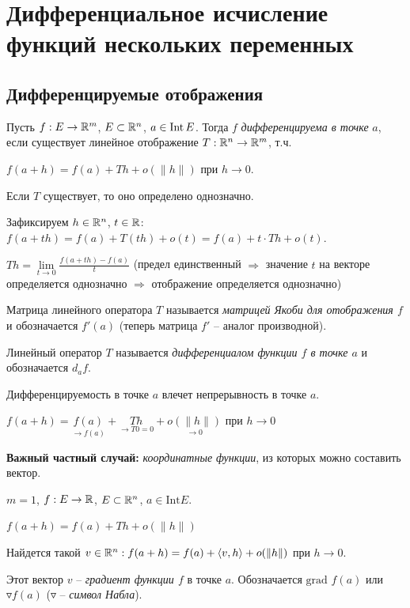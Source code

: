 \newpage
\section{Дифференциальное исчисление функций нескольких переменных}
\subsection{Дифференцируемые отображения}

\begin{definition}
    Пусть $f: E\rightarrow \mathbb{R}^m$, $E\subset \mathbb{R}^n$, $a\in \operatorname{Int} E$. Тогда $f$ \textit{дифференцируема в точке} $a$, если существует линейное отображение $T: \mathbb{R}^n \rightarrow \mathbb{R}^m$, т.ч. 
    
    $f(a + h) = f(a) + Th + o(\|h\|)$ при $h\rightarrow 0$.
\end{definition}

\begin{remark}
    Если $T$ существует, то оно определено однозначно. 
    
    Зафиксируем $h\in \mathbb{R}^n$, $t\in \mathbb{R}$: $f(a+th)=f(a)+T(th)+o(t)=f(a)+t\cdot Th + o(t)$.

    $Th = \lim\limits_{t\rightarrow 0}\frac{f(a+th)-f(a)}{t}$ (предел единственный $\Rightarrow$ значение $t$ на векторе определяется однозначно $\Rightarrow$ отображение определяется однозначно)
\end{remark}

\begin{definition}
    Матрица линейного оператора $T$ называется \textit{матрицей Якоби для отображения $f$} и обозначается $f'(a)$ (теперь матрица $f'$ – аналог производной).

    Линейный оператор $T$ называется \textit{дифференциалом функции $f$ в точке $a$} и обозначается $d_af$.
\end{definition}

\begin{remark}
    Дифференцируемость в точке $a$ влечет непрерывность в точке $a$.

    $f(a+h)=\underset{\rightarrow f(a)}{f(a)}+\underset{\rightarrow T0=0}{Th}+\underset{\rightarrow 0}{o(\|h\|)}$ при $h \rightarrow 0$
\end{remark}

\begin{remark}
    \textbf{Важный частный случай:} \textit{координатные функции}, из которых можно составить вектор.
    
    $m=1$, $f: E\rightarrow \mathbb{R}$, $E\subset \mathbb{R}^n$, $a\in \text{Int} E$.

    $f(a+h)=f(a)+Th+o(\|h\|)$ 

    Найдется такой $v\in \mathbb{R}^n: f(a+h)=f(a)+\langle v, h\rangle +o(\|h\|)$ при $h\rightarrow 0$. 

    \begin{definition}
        Этот вектор $v$ – \textit{градиент функции $f$} в точке $a$. Обозначается $\text{grad } f(a)$ или $\triangledown f(a)$ ($\triangledown$ – \textit{символ Набла}).    
    \end{definition}
\end{remark}

